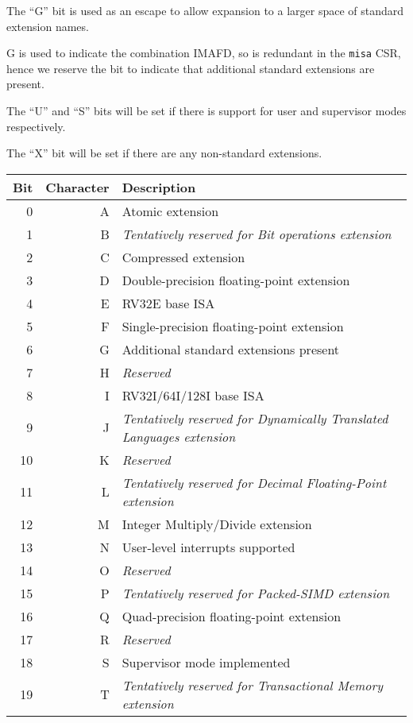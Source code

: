 The ``G'' bit is used as an escape to allow expansion to a larger
space of standard extension names.
\begin{commentary}
G is used to indicate the combination IMAFD, so is redundant in the
{\tt misa} CSR, hence we reserve the bit to indicate that
additional standard extensions are present.
\end{commentary}

The ``U'' and ``S'' bits will be set if there is support for user and
supervisor modes respectively.

The ``X'' bit will be set if there are any non-standard extensions.

\begin{table*}
\begin{center}
\begin{tabular}{|r|r|l|}
\hline
Bit & Character  & Description \\
\hline	 
  0 & A & Atomic extension \\
  1 & B & {\em Tentatively reserved for Bit operations extension} \\
  2 & C & Compressed extension \\
  3 & D & Double-precision floating-point extension \\
  4 & E & RV32E base ISA \\
  5 & F & Single-precision floating-point extension \\
  6 & G & Additional standard extensions present \\
  7 & H & {\em Reserved} \\
  8 & I & RV32I/64I/128I base ISA \\
  9 & J & {\em Tentatively reserved for Dynamically Translated Languages extension} \\
 10 & K & {\em Reserved} \\
 11 & L & {\em Tentatively reserved for Decimal Floating-Point extension} \\
 12 & M & Integer Multiply/Divide extension \\
 13 & N & User-level interrupts supported \\
 14 & O & {\em Reserved} \\
 15 & P & {\em Tentatively reserved for Packed-SIMD extension} \\
 16 & Q & Quad-precision floating-point extension \\
 17 & R & {\em Reserved} \\
 18 & S & Supervisor mode implemented \\
 19 & T & {\em Tentatively reserved for Transactional Memory extension} \\

\end{tabular}
\end{center}
\end{table*}
